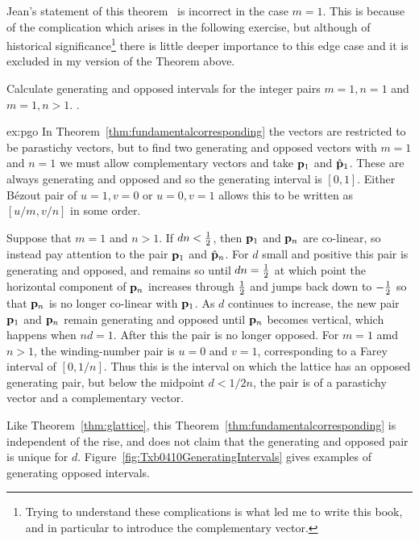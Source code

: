 Jean's statement of this theorem~\autocite{jeanPhyllotaxisSystemicStudy1994} is incorrect in the case $m=1$. This is because of the complication which arises in the following exercise, but although of historical significance\footnote{Trying to understand these complications is what led me to write this book, and in particular to introduce the complementary vector.} there is little deeper importance to this edge case and it is excluded in my version of the Theorem above.

\begin{jExercise}\label{ex:pgo}
	Calculate generating and opposed intervals for the integer pairs $m=1,n=1$ and $m=1,n>1$.
	\label{ex:ftpfail}.
\end{jExercise}
\begin{jAnswer}{ex:pgo}
	In Theorem~\ref{thm:fundamentalcorresponding} the vectors are restricted to be parastichy vectors, but to find two generating and opposed vectors  with $m=1$ and $n=1$ we must allow complementary vectors and take ${\mathbf p}_{1}$ and $\hat{\mathbf p}_{1}$. 
	These are always generating and opposed and so the generating interval is $[0,1]$. 
	Either B\'ezout pair of $u=1, v=0$ or $u=0,v=1$ allows this to be written as $[u/m,v/n]$ in some order.
	
	Suppose that $m=1$ and $n>1$. If $dn<\textstyle{\frac{1}{2}}$, then ${\mathbf p}_{1}$ and ${\mathbf p}_{n}$ are co-linear, so instead pay attention to the pair ${\mathbf p}_{1}$ and $\hat{\mathbf p}_{n}$. For $d$ small and positive this pair is generating and opposed, and remains so until $dn=\textstyle{\frac{1}{2}}$ at which point the horizontal component of ${\mathbf p}_{n}$ increases through $\textstyle{\frac{1}{2}}$ and jumps back down to $-\textstyle{\frac{1}{2}}$ so that  ${\mathbf p}_{n}$ is no longer co-linear with ${\mathbf p}_{1}$. As $d$ continues to increase, the new pair ${\mathbf p}_{1}$ and ${\mathbf p}_{n}$ remain generating and opposed until
	 ${\mathbf p}_{n}$ becomes vertical, which happens when $nd=1$. After this the pair is no longer opposed.
	 	 For $m=1$ amd $n>1$, the winding-number pair is $u=0$ and $v=1$, corresponding to a Farey interval of $[0,1/n]$. Thus this is the interval on which the lattice has an opposed generating pair, but below the midpoint $d<1/2n$, the pair is of a parastichy vector and a complementary vector. 
	 

\end{jAnswer}

Like Theorem~\ref{thm:glattice}, this Theorem~\ref{thm:fundamentalcorresponding} is independent of the rise, and does not claim that the generating and opposed pair is unique for $d$. Figure~\ref{fig:Txb0410GeneratingIntervals} gives examples of generating opposed intervals. %


